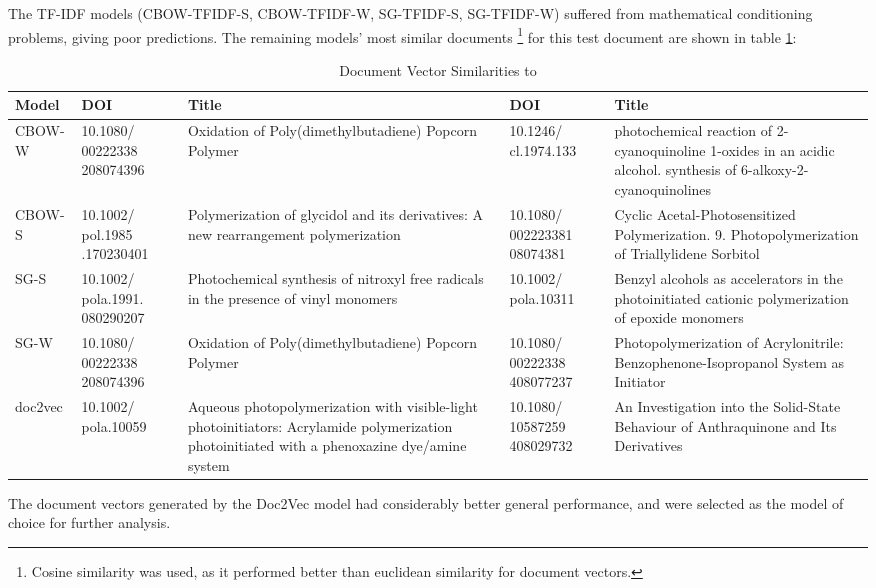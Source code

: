  The TF-IDF models (CBOW-TFIDF-S, CBOW-TFIDF-W, SG-TFIDF-S, SG-TFIDF-W) suffered from mathematical conditioning problems, giving poor predictions. The remaining models' most similar documents \footnote{Cosine similarity was used, as it performed better than euclidean similarity for document vectors.} for this test document are shown in table \ref{tab:DOCSIMS}:
\begin{table}[H]
\centering
\caption[Examination of Document Vector similarities]{Document Vector Similarities to \cite{docassay}}
\label{tab:DOCSIMS}
\begin{tabular}{|l|p{2cm}|p{4cm}|p{2cm}|p{4cm}|}
\hline
Model           & DOI            & Title            & DOI              & Title              \\ \hline
CBOW-W               & 10.1080/ 00222338 208074396         & \footnotesize{Oxidation of Poly(dimethylbutadiene) Popcorn Polymer} &  10.1246/ cl.1974.133               &                   \footnotesize{photochemical reaction of 2-cyanoquinoline 1-oxides in an acidic alcohol. synthesis of 6-alkoxy-2-cyanoquinolines} \\ \hline
CBOW-S               & 10.1002/ pol.1985 .170230401          &  \footnotesize{Polymerization of glycidol and its derivatives: A new rearrangement polymerization}
                & 10.1080/ 002223381 08074381                & \footnotesize{Cyclic Acetal-Photosensitized Polymerization. 9. Photopolymerization of Triallylidene Sorbitol}
                   \\ \hline
SG-S                 & 10.1002/ pola.1991. 080290207            &   \footnotesize{Photochemical synthesis of nitroxyl free radicals in the presence of vinyl monomers}
               &  10.1002/ pola.10311              &  \footnotesize{Benzyl alcohols as accelerators in the photoinitiated cationic polymerization of epoxide monomers}
                  \\ \hline
SG-W                 & 10.1080/ 00222338 208074396            &    \footnotesize{Oxidation of Poly(dimethylbutadiene) Popcorn Polymer}
              & 10.1080/ 00222338 408077237                &  \footnotesize{Photopolymerization of Acrylonitrile: Benzophenone-Isopropanol System as Initiator}
                 \\ \hline
doc2vec                    &  10.1002/ pola.10059              &  \footnotesize{Aqueous photopolymerization with visible-light photoinitiators: Acrylamide polymerization photoinitiated with a phenoxazine dye/amine system}
                & 10.1080/ 10587259 408029732                 & \footnotesize{ An Investigation into the Solid-State Behaviour of Anthraquinone and Its Derivatives}
                 \\ \hline
\end{tabular}
\end{table}
The document vectors generated by the Doc2Vec model had considerably better general performance, and were selected as the model of choice for further analysis.  
